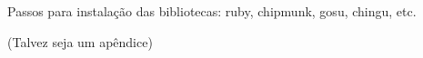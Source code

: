 Passos para instalação das bibliotecas: ruby, chipmunk, gosu, chingu, etc.

(Talvez seja um apêndice)
